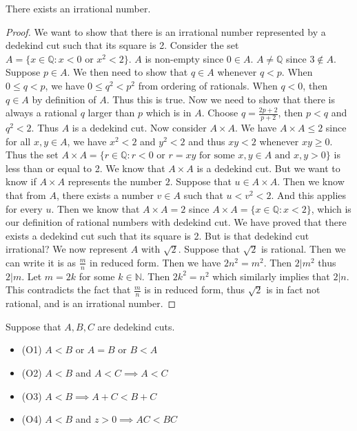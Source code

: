 \begin{thm}{}{} There exists an irrational number. \tcbline
\begin{proof} We want to show that there is an irrational number represented by a dedekind cut such that its square is 2. Consider the set $A=\{x\in\mathbb{Q}:x<0\text{ or }x^2<2\}$. $A$ is non-empty since $0\in A$. $A\neq\mathbb{Q}$ since $3\notin A$. Suppose $p\in A$. We then need to show that $q\in A$ whenever $q<p$. When $0\leq q<p$, we have $0\leq q^2<p^2$ from ordering of rationals. When $q<0$, then $q\in A$ by definition of $A$. Thus this is true. Now we need to show that there is always a rational $q$ larger than $p$ which is in $A$. Choose $q=\frac{2p+2}{p+2}$, then $p<q$ and $q^2<2$. Thus $A$ is a dedekind cut. \linebreak\linebreak
Now consider $A\times A$. We have $A\times A\leq 2$ since for all $x,y\in A$, we have $x^2<2$ and $y^2<2$ and thus $xy<2$ whenever $xy\geq 0$. Thus the set $A\times A=\{r\in\mathbb{Q}:r<0\text{ or }r=xy\text{ for some }x,y\in A\text{ and }x,y>0\}$ is less than or equal to 2. We know that $A\times A$ is a dedekind cut. But we want to know if $A\times A$ represents the number $2$. Suppose that $u\in A\times A$. Then we know that from $A$, there exists a number $v\in A$ such that $u<v^2<2$. And this applies for every $u$. Then we know that $A\times A=2$ since $A\times A=\{x\in\mathbb{Q}:x<2\}$, which is our definition of rational numbers with dedekind cut. \linebreak\linebreak
We have proved that there exists a dedekind cut such that its square is 2. But is that dedekind cut irrational? We now represent $A$ with $\sqrt2$. Suppose that $\sqrt2$ is rational. Then we can write it is as $\frac{m}{n}$ in reduced form. Then we have $2n^2=m^2$. Then $2|m^2$ thus $2|m$. Let $m=2k$ for some $k\in\mathbb{N}$. Then $2k^2=n^2$ which similarly implies that $2|n$. This contradicts the fact that $\frac{m}{n}$ is in reduced form, thus $\sqrt{2}$ is in fact not rational, and is an irrational number. 
\end{proof}
\end{thm}

\begin{prp}{}{} Suppose that $A,B,C$ are dedekind cuts. 
\begin{itemize}
\item (O1) $A<B$ or $A=B$ or $B<A$
\item (O2) $A<B$ and $A<C\implies A<C$
\item (O3) $A<B\implies A+C<B+C$
\item (O4) $A<B$ and $z>0\implies AC<BC$
\end{itemize}
\end{prp}

